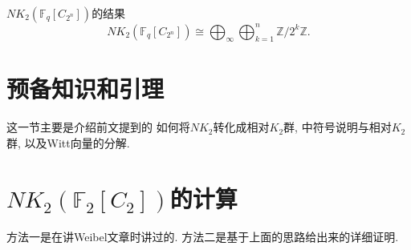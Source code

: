 $NK_2(\mathbb{F}_q[C_{2^n}])$的结果
{\color{red}\[NK_2(\mathbb{F}_q[C_{2^n}])\cong \bigoplus_\infty \bigoplus_{k=1}^n \mathbb{Z}/2^k\mathbb{Z}. \]}



\section{预备知识和引理}
这一节主要是介绍前文提到的{\color{blue} 如何将$NK_2$转化成相对$K_2$群, \cite{MR86f:18017}中符号说明与相对$K_2$群, 以及Witt向量的分解}. 






\section{$NK_2(\mathbb{F}_2[C_2])$的计算}
方法一是在讲Weibel文章\cite{weibel2009nk0}时讲过的. 方法二是基于上面的思路给出来的详细证明. 
